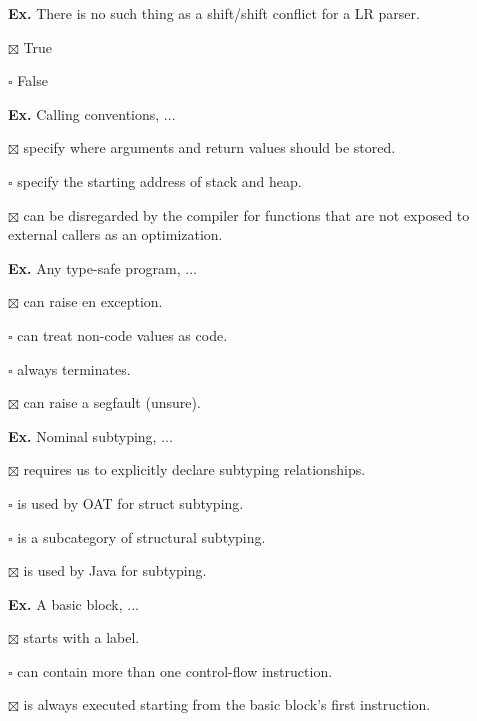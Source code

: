 \hrulefill

\textbf{Ex.} There is no such thing as a shift/shift conflict for a LR parser.
\begin{compactitem}
	\item[$\boxtimes$] True
	\item[$\square$] False
\end{compactitem}

\hrulefill

\textbf{Ex.} Calling conventions, ...
\begin{compactitem}
	\item[$\boxtimes$] specify where arguments and return values should be stored.
	\item[$\square$] specify the starting address of stack and heap.
	\item[$\boxtimes$] can be disregarded by the compiler for functions that are not exposed to external callers as an optimization.
\end{compactitem}

\hrulefill

\textbf{Ex.} Any type-safe program, ...
\begin{compactitem} 
	\item[$\boxtimes$] can raise en exception.
	\item[$\square$] can treat non-code values as code.
	\item[$\square$] always terminates.
	\item[$\boxtimes$] can raise a segfault (unsure).
\end{compactitem}

\hrulefill

\textbf{Ex.} Nominal subtyping, ...
\begin{compactitem} 
	\item[$\boxtimes$] requires us to explicitly declare subtyping relationships.
	\item[$\square$] is used by OAT for struct subtyping.
	\item[$\square$] is a subcategory of structural subtyping.
	\item[$\boxtimes$] is used by Java for subtyping.
\end{compactitem}

\hrulefill

\textbf{Ex.} A basic block, ...
\begin{compactitem}
	\item[$\boxtimes$] starts with a label.
	\item[$\square$] can contain more than one control-flow instruction.
	\item[$\boxtimes$] is always executed starting from the basic block's first instruction.
\end{compactitem}


